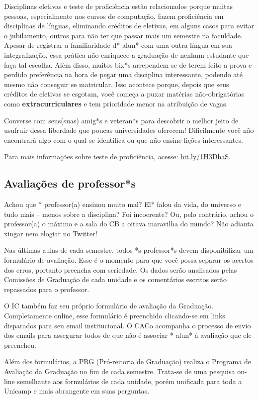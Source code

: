 Disciplinas eletivas e teste de proficiência estão relacionados porque muitas
pessoas, especialmente nos cursos de computação, fazem proficiência em
disciplinas de línguas, eliminando créditos de eletivas, em alguns casos para
evitar o jubilamento, outros para não ter que passar mais um semestre na
faculdade. Apesar de registrar a familiaridade d* alun* com uma outra língua em
sua integralização, essa prática não enriquece a graduação de nenhum estudante
que faça tal escolha. Além disso, muitos bix*s arrependem-se de terem feito a
prova e perdido preferência na hora de pegar uma disciplina interessante,
podendo até mesmo não conseguir se matricular. Isso acontece porque, depois que
seus créditos de eletivas se esgotam, você começa a puxar matérias
não-obrigatórias como \textbf{extracurriculares} e tem prioridade menor na
atribuição de vagas.

Converse com seus(suas) amig*s e veteran*s para descobrir o melhor jeito de
usufruir dessa liberdade que poucas universidades oferecem! Dificilmente você
não encontrará algo com o qual se identifica ou que não ensine lições
interessantes.

Para mais informações sobre teste de proficiência, acesse: \url{bit.ly/1H3DhaS}.

\subsection{Avaliações de professor*s}

Achou que * professor(a) ensinou muito mal? El* falou da vida, do universo e
tudo mais -- menos sobre a disciplina? Foi incoerente? Ou, pelo contrário, achou
o professor(a) o máximo e a sala do CB a oitava maravilha do mundo? Não adianta
xingar nem elogiar no Twitter!

Nas últimas aulas de cada semestre, todos *s professor*s devem disponibilizar um
formulário de avaliação. Esse é o momento para que você possa separar os acertos
dos erros, portanto preencha com seriedade. Os dados serão analisados pelas
Comissões de Graduação de cada unidade e os comentários escritos serão
repassados para o professor.

O IC também faz seu próprio formulário de avaliação da Graduação. Completamente
online, esse formulário é preenchido clicando-se em links disparados para seu
email institucional. O CACo acompanha o processo de envio dos emails para
assegurar todos de que não é associar * alun* à avaliação que ele preencheu.

Além dos formulários, a PRG (Pró-reitoria de Graduação) realiza o Programa de
Avaliação da Graduação no fim de cada semestre. Trata-se de uma pesquisa on-line
semelhante aos formulários de cada unidade, porém unificada para toda a Unicamp
e mais abrangente em suas perguntas.

